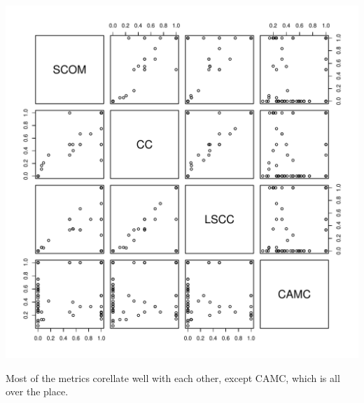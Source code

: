 \documentclass[a4paper]{article}
\begin{document}
\includegraphics[width=0.950\linewidth]{trellis.pdf}

Most of the metrics corellate well with each other, except CAMC, which is all
over the place.
\end{document}
